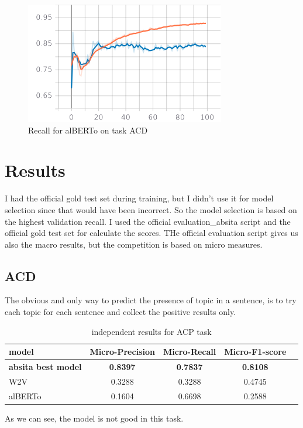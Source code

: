 \documentclass{article}
\begin{document}
\begin{figure}[!htb]
\begin{minipage}{0.48\textwidth}
                    \centering
                    \includegraphics[width=.7\linewidth]{alberto_acd_epoch_recall.png}
                    \caption{Recall for alBERTo on task ACD}\label{Fig:Data12}
                \end{minipage}
            \end{figure}

    \section{Results}\label{sec:s5}
        I had the official gold test set during training, but I didn't use it for model selection since that would have been incorrect.
        So the model selection is based on the highest validation recall.
        I used the official evaluation\_absita script and the official gold test set for calculate the scores.
        THe official evaluation script gives us also the macro results, but the competition is based on micro measures.
        \subsection{ACD}\label{subsec:s5}
            The obvious and only way to predict the presence of topic in a sentence, is to try each topic for each sentence and collect the positive results only.
                \begin{table}[h!]
                    \begin{center}
                        \caption{independent results for ACP task}
                        \label{tab:table2}
                        \begin{tabular}{l|c|c|c|r}
                            \textbf{model} & \textbf{Micro-Precision} & \textbf{Micro-Recall} & \textbf{Micro-F1-score}\\
                            \hline
                                \textbf{absita best model} & \textbf{0.8397} & \textbf{0.7837} & \textbf{0.8108}\\
                                W2V & 0.3288 & 0.3288 & 0.4745\\
                                alBERTo & 0.1604 & 0.6698 & 0.2588\\
                        \end{tabular}
                    \end{center}
                \end{table}
        As we can see, the model is not good in this task.
\end{document}
